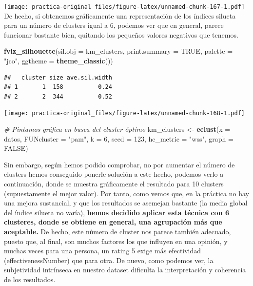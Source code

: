 \documentclass[spanish,]{article}
\newenvironment{Shaded}{\begin{snugshade}}{\end{snugshade}}
\newcommand{\KeywordTok}[1]{\textcolor[rgb]{0.13,0.29,0.53}{\textbf{#1}}}
\newcommand{\DataTypeTok}[1]{\textcolor[rgb]{0.13,0.29,0.53}{#1}}
\newcommand{\DecValTok}[1]{\textcolor[rgb]{0.00,0.00,0.81}{#1}}
\newcommand{\StringTok}[1]{\textcolor[rgb]{0.31,0.60,0.02}{#1}}
\newcommand{\CommentTok}[1]{\textcolor[rgb]{0.56,0.35,0.01}{\textit{#1}}}
\newcommand{\OtherTok}[1]{\textcolor[rgb]{0.56,0.35,0.01}{#1}}
\newcommand{\NormalTok}[1]{#1}
\begin{document}
\texttt{[image: practica-original\_files/figure-latex/unnamed-chunk-167-1.pdf]}
De hecho, si obtenemos gráficamente una representación de los índices
silueta para un número de clusters igual a 6, podemos ver que en
general, parece funcionar bastante bien, quitando los pequeños valores
negativos que tenemos.

\begin{Shaded}
\begin{Highlighting}[]
\KeywordTok{fviz_silhouette}\NormalTok{(}\DataTypeTok{sil.obj =}\NormalTok{ km_clusters, }\DataTypeTok{print.summary =} \OtherTok{TRUE}\NormalTok{, }\DataTypeTok{palette =} \StringTok{"jco"}\NormalTok{,}
                \DataTypeTok{ggtheme =} \KeywordTok{theme_classic}\NormalTok{()) }
\end{Highlighting}
\end{Shaded}

\begin{verbatim}
##   cluster size ave.sil.width
## 1       1  158          0.24
## 2       2  344          0.52
\end{verbatim}

\texttt{[image: practica-original\_files/figure-latex/unnamed-chunk-168-1.pdf]}

\begin{Shaded}
\begin{Highlighting}[]
\CommentTok{# Pintamos gráfica en busca del cluster óptimo}
\NormalTok{km_clusters <-}\StringTok{ }\KeywordTok{eclust}\NormalTok{(}\DataTypeTok{x =}\NormalTok{ datos, }\DataTypeTok{FUNcluster =} \StringTok{"pam"}\NormalTok{, }\DataTypeTok{k =} \DecValTok{6}\NormalTok{, }\DataTypeTok{seed =} \DecValTok{123}\NormalTok{,}
                      \DataTypeTok{hc_metric =} \StringTok{"wss"}\NormalTok{,  }\DataTypeTok{graph =} \OtherTok{FALSE}\NormalTok{)}
\end{Highlighting}
\end{Shaded}

Sin embargo, según hemos podido comprobar, no por aumentar el número de
clusters hemos conseguido ponerle solución a este hecho, podemos verlo a
continuación, donde se muestra gráficamente el resultado para 10
clusters (supuestamente el mejor valor). Por tanto, como vemos que, en
la práctica no hay una mejora sustancial, y que los resultados se
asemejan bastante (la media global del índice silueta no varía),
\textbf{hemos decidido aplicar esta técnica con 6 clusteres, donde se
obtiene en general, una agrupación más que aceptable.} De hecho, este
número de cluster nos parece también adecuado, puesto que, al final, son
muchos factores los que influyen en una opinión, y muchas veces para una
persona, un rating 5 exige más efectividad (effectivenessNumber) que
para otra. De nuevo, como podemos ver, la subjetividad intrínseca en
nuestro dataset dificulta la interpretación y coherencia de los
resultados.
\end{document}
